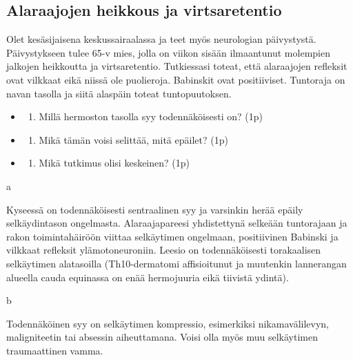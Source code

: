 \documentclass[
]{book}
\providecommand{\tightlist}{%
  \setlength{\itemsep}{0pt}\setlength{\parskip}{0pt}}
\begin{document}
\subsection{Alaraajojen heikkous ja virtsaretentio}\label{alaraajojen-heikkous-ja-virtsaretentio}

Olet kesäsijaisena keskussairaalassa ja teet myös neurologian päivystystä. Päivystykseen tulee 65-v mies, jolla on viikon sisään ilmaantunut molempien jalkojen heikkoutta ja virtsaretentio. Tutkiessasi toteat, että alaraajojen refleksit ovat vilkkaat eikä niissä ole puolieroja. Babinskit ovat positiiviset. Tuntoraja on navan tasolla ja siitä alaspäin toteat tuntopuutoksen.

\begin{itemize}
\tightlist
\item
  \begin{enumerate}
  \def\labelenumi{\alph{enumi}.}
  \tightlist
  \item
    Millä hermoston tasolla syy todennäköisesti on? (1p)
  \end{enumerate}
\item
  \begin{enumerate}
  \def\labelenumi{\alph{enumi}.}
  \setcounter{enumi}{1}
  \tightlist
  \item
    Mikä tämän voisi selittää, mitä epäilet? (1p)
  \end{enumerate}
\item
  \begin{enumerate}
  \def\labelenumi{\alph{enumi}.}
  \setcounter{enumi}{2}
  \tightlist
  \item
    Mikä tutkimus olisi keskeinen? (1p)
  \end{enumerate}
\end{itemize}

a

Kyseessä on todennäköisesti sentraalinen syy ja varsinkin herää epäily selkäydintason ongelmasta. Alaraajapareesi yhdistettynä selkeään tuntorajaan ja rakon toimintahäiröön viittaa selkäytimen ongelmaan, positiivinen Babinski ja vilkkaat refleksit ylämotoneuroniin. Leesio on todennäköisesti torakaalisen selkäytimen alatasoilla (Th10-dermatomi affisioitunut ja muutenkin lannerangan alueella cauda equinassa on enää hermojuuria eikä tiivistä ydintä).

b

Todennäköinen syy on selkäytimen kompressio, esimerkiksi nikamavälilevyn, maligniteetin tai absessin aiheuttamana. Voisi olla myös muu selkäytimen traumaattinen vamma.
\end{document}
